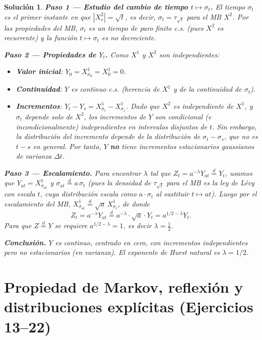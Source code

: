 \documentclass[12pt,letterpaper]{article}
\theoremstyle{ejercicio}
\theoremstyle{solucion}
\newtheorem*{solucion}{Solución}
\newcommand{\dto}{\overset{d}{=}}
\begin{document}
\begin{solucion}

\textbf{Paso 1 — Estudio del cambio de tiempo $t\mapsto\sigma_t$.}
El tiempo $\sigma_t$ es el primer instante en que $|X^2_s|=\sqrt{t}$, es decir,
$\sigma_t=\tau_{\sqrt{t}}$ para el MB $X^2$. Por las propiedades del MB,
$\sigma_t$ es un tiempo de paro finito c.s. (pues $X^2$ es recurrente) y la función
$t\mapsto\sigma_t$ es no decreciente.

\textbf{Paso 2 — Propiedades de $Y_t$.}
Como $X^1$ y $X^2$ son independientes:
\begin{itemize}[leftmargin=*]
  \item \textbf{Valor inicial}: $Y_0 = X^1_{\sigma_0} = X^1_0 = 0$.
  \item \textbf{Continuidad}: $Y$ es continuo c.s. (herencia de $X^1$ y de la continuidad de $\sigma_t$).
  \item \textbf{Incrementos}: $Y_t-Y_s = X^1_{\sigma_t}-X^1_{\sigma_s}$. Dado que
        $X^2$ es independiente de $X^1$, y $\sigma_t$ depende solo de $X^2$,
        los incrementos de $Y$ son condicional (e incondicionalmente) independientes
        en intervalos disjuntos de $t$. Sin embargo, la distribución del incremento
        depende de la distribución de $\sigma_t-\sigma_s$, que \emph{no} es $t-s$
        en general. Por tanto, $Y$ \textbf{no} tiene incrementos estacionarios gaussianos
        de varianza $\Delta t$.
\end{itemize}

\textbf{Paso 3 — Escalamiento.}
Para encontrar $\lambda$ tal que $Z_t=a^{-\lambda}Y_{at}\dto Y_t$, usamos que
$Y_{at}=X^1_{\sigma_{at}}$ y $\sigma_{at}\dto a\,\sigma_t$ (pues la densidad de
$\tau_{\sqrt{t}}$ para el MB es la ley de Lévy con escala $t$, cuya distribución escala
como $a\cdot\sigma_t$ al sustituir $t\mapsto at$). Luego por el escalamiento del MB,
$X^1_{\sigma_{at}}\dto\sqrt{a}\,X^1_{\sigma_t}$, de donde
\[
  Z_t = a^{-\lambda}Y_{at} \dto a^{-\lambda}\cdot\sqrt{a}\cdot Y_t = a^{1/2-\lambda}Y_t.
\]
Para que $Z\dto Y$ se requiere $a^{1/2-\lambda}=1$, es decir $\lambda=\tfrac{1}{2}$.

\textbf{Conclusión.} $Y$ es continuo, centrado en cero, con incrementos independientes pero
no estacionarios (en varianza). El exponente de Hurst natural es $\lambda=1/2$.
\end{solucion}

\newpage
\section{Propiedad de Markov, reflexión y distribuciones explícitas (Ejercicios 13–22)}
\end{document}
